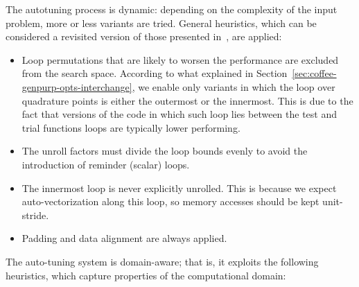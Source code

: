 The autotuning process is dynamic: depending on the complexity of the input problem, more or less variants are tried. General heuristics, which can be considered a revisited version of those presented in~\cite{nek5000}, are applied:
\begin{itemize}
\item Loop permutations that are likely to worsen the performance are excluded from the search space. According to what explained in Section~\ref{sec:coffee-genpurp-opts-interchange}, we enable only variants in which the loop over quadrature points is either the outermost or the innermost. This is due to the fact that versions of the code in which such loop lies between the test and trial functions loops are typically lower performing.
\item The unroll factors must divide the loop bounds evenly to avoid the introduction of reminder (scalar) loops.
\item The innermost loop is never explicitly unrolled. This is because we expect auto-vectorization along this loop, so memory accesses should be kept unit-stride. 
\item Padding and data alignment are always applied. 
\end{itemize}
The auto-tuning system is domain-aware; that is, it exploits the following heuristics, which capture properties of the computational domain:

